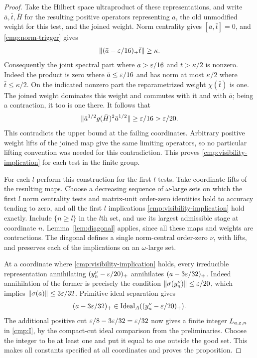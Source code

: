 \begin{proof}
Take the Hilbert space ultraproduct of these representations, and
write $\bar a,\bar t,\bar H$ for the resulting positive operators
representing $a$, the old unmodified weight for this test, and the
joined weight.  Norm centrality gives $[\bar a,\bar t]=0$, and
\eqref{cmp:norm-trigger} gives
\[
 \| (\bar a-\varepsilon/16)_+\bar t\|\ge\kappa.
\]
Consequently the joint spectral part where $\bar a>\varepsilon/16$ and
$\bar t>\kappa/2$ is nonzero.  Indeed the product is zero where
$\bar a\le\varepsilon/16$ and has norm at most $\kappa/2$ where
$\bar t\le\kappa/2$.  On the indicated nonzero part the
reparametrized weight $\chi(\bar t)$ is one.  The joined weight
dominates this weight and commutes with it and with $\bar a$;
being a contraction, it too is one there.  It follows that
\[
 \|\bar a^{1/2}g(\bar H)^2\bar a^{1/2}\|
       \ge\varepsilon/16>\varepsilon/20.
\]
This contradicts the upper bound at the failing coordinates.
Arbitrary positive weight lifts of the joined map give the same
limiting operators, so no particular lifting convention was needed
for this contradiction.  This proves
\eqref{cmp:visibility-implication} for each test in the finite group.

For each $l$ perform this construction for the first $l$ tests.
Take \cpc coordinate lifts of the resulting maps.  Choose a decreasing
sequence of $\omega$-large sets on which the first $l$ norm
centrality tests and matrix-unit order-zero identities hold to
accuracy tending to zero, and all the first $l$ implications
\eqref{cmp:visibility-implication} hold exactly.  Include $\{n\ge l\}$
in the $l$th set, and use its largest admissible stage at coordinate
$n$.  Lemma~\ref{lem:diagonal} applies, since all these maps and
weights are contractions.  The diagonal defines a single
norm-central order-zero $\nu$, with \cpc lifts, and preserves each
of the implications on an $\omega$-large set.

At a coordinate where \eqref{cmp:visibility-implication} holds,
every irreducible representation annihilating
$(y_n^\nu-\varepsilon/20)_+$ annihilates $(a-3\varepsilon/32)_+$.  Indeed
annihilation of the former is precisely the condition
$\|\sigma(y_n^\nu)\|\le\varepsilon/20$, which implies
$\|\sigma(a)\|\le3\varepsilon/32$.  Primitive ideal separation gives
\[
 (a-3\varepsilon/32)_+\in\operatorname{Ideal}_A((y_n^\nu-\varepsilon/20)_+).
\]
The additional positive cut $\varepsilon/8-3\varepsilon/32=\varepsilon/32$ now gives a
finite integer $L_{a,\varepsilon,n}$ in \eqref{cmp:I}, by the compact-cut
ideal comparison from the preliminaries.  Choose the integer to be
at least one and put it equal to one outside the good set.  This
makes all constants specified at all coordinates and proves the
proposition.
\end{proof}

